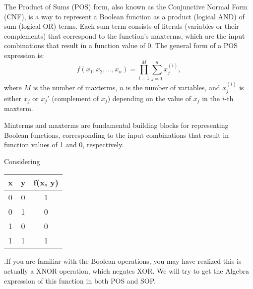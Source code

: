     \begin{definition}
        The Product of Sums (POS) form, also known as the Conjunctive Normal Form (CNF), is a way to represent a Boolean function as a product (logical AND) of sum (logical OR) terms. Each sum term consists of literals (variables or their complements) that correspond to the function's maxterms, which are the input combinations that result in a function value of 0.
        The general form of a POS expression is:
        \[f(x_1, x_2, \ldots, x_n) = \prod_{i=1}^{M} \sum_{j=1}^{n} x_j^{(i)},\]
        where $M$ is the number of maxterms, $n$ is the number of variables, and $x_j^{(i)}$ is either $x_j$ or $x_j'$ (complement of $x_j$) depending on the value of $x_j$ in the $i$-th maxterm.
        \end{definition}
    \begin{remark}
        Minterms and maxterms are fundamental building blocks for representing Boolean functions, corresponding to the input combinations that result in function values of 1 and 0, respectively.
    \end{remark}
    \begin{example}
        Considering
        \begin{tabular}{|c|c|c|}
            \hline
            x & y & f(x, y) \\
            \hline
            0 & 0 & 1 \\
            \hline
            0 & 1 & 0 \\
            \hline
            1 & 0 & 0 \\
            \hline
            1 & 1 & 1 \\
            \hline
            \end{tabular}
            .If you are familiar with the Boolean operations, you may have realized this is actually a XNOR operation, which negates XOR.
            We will try to get the Algebra expression of this function in both POS and SOP.
             
    \end{example}

